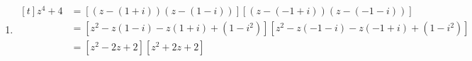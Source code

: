 \documentclass[11pt,a4paper]{book}
\begin{document}
\begin{example}
\begin{enumerate}[label=(\alph*)]
\item
$
\begin{aligned}[t]
z^{4}+4 & =\left[\left(z-\left(1+i\right)\right)\left(z-\left(1-i\right)\right)\right]\left[\left(z-\left(-1+i\right)\right)\left(z-\left(-1-i\right)\right)\right]\\
 & =\left[z^{2}-z\left(1-i\right)-z\left(1+i\right)+\left(1-i^{2}\right)\right]\left[z^{2}-z\left(-1-i\right)-z\left(-1+i\right)+\left(1-i^{2}\right)\right]\\
 & =\left[z^{2}-2z+2\right]\left[z^{2}+2z+2\right]
\end{aligned}
$

\end{enumerate}
\end{example}
\end{document}
